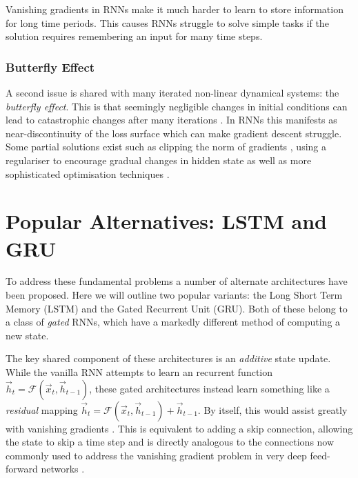 Vanishing gradients in RNNs make it much harder to learn to
store information for long time periods. This causes RNNs struggle to
solve simple tasks if the solution requires remembering an input for many
time steps.

\subsubsection{Butterfly Effect}
A second issue is shared with many iterated non-linear	
dynamical systems: the \emph{butterfly effect}. This is that seemingly negligible changes
in initial conditions can lead to catastrophic changes after many iterations
\autocite{Lorenz1963}. In RNNs this manifests as near-discontinuity of the loss surface
which can make gradient descent struggle.
Some
partial solutions exist such as clipping the norm of gradients \autocite{Pascanu2012},
using a regulariser to encourage gradual changes in hidden state \autocite{Krueger2016}
as well as more sophisticated optimisation techniques \autocite{Martens2011}.

\section{Popular Alternatives: LSTM and GRU}
To address these fundamental problems a number of alternate architectures have been proposed.
Here we will outline two popular variants: the Long Short Term Memory (LSTM) and the Gated
Recurrent Unit (GRU). Both of these belong to a class of \emph{gated} RNNs, which have a
markedly different method of computing a new state.

The key shared component of these architectures is an \emph{additive} state update. 
While the vanilla RNN attempts to learn an recurrent function
\(\vec{h}_t = \mathcal{F}(\vec{x}_t, \vec{h}_{t-1})\), these gated architectures instead learn
something like
a \emph{residual} mapping \(\vec{h}_t = \mathcal{F}(\vec{x}_t, \vec{h}_{t-1}) + \vec{h}_{t-1}\).
By itself, this would assist greatly with vanishing gradients 
\autocite{Jozefowicz2015, Hochreiter1997}. This is equivalent to adding a skip connection,
allowing the state to skip a time step and is directly analogous to the connections
now commonly used to address the vanishing gradient problem in very deep feed-forward networks
\autocite{He2015, Duvenaud2014, Szegedy2016}.

